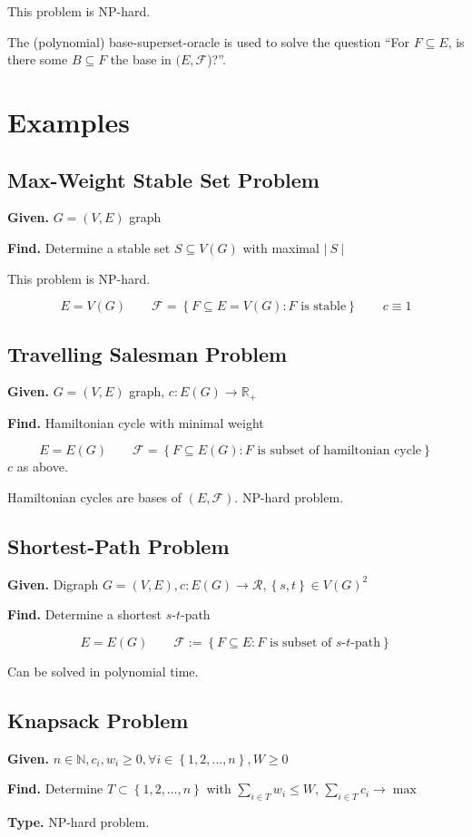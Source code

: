 \documentclass{article}
\newcommand{\card}[1]{\left|\:\!#1\:\!\right|}
\newcommand{\set}[1]{\left\{#1\right\}}
\newcommand{\given}[1]{\textbf{Given.} #1\par}
\newcommand{\find}[1]{\textbf{Find.} #1\par}
\newcommand{\gath}[2]{$#1$-$#2$-path} %
\begin{document}
This problem is NP-hard.

The (polynomial) base-superset-oracle is used to solve the question ``For $F \subseteq E$, is there some $B \subseteq F$ the base in $(E, \mathcal{F}$)?''.

\section{Examples}
\subsection{Max-Weight Stable Set Problem}
%
\given{$G = (V, E)$ graph}
\find{Determine a stable set $S \subseteq V(G)$ with maximal $\card{S}$}

This problem is NP-hard.

\[ E = V(G)  \qquad  \mathcal{F} = \set{F \subseteq E = V(G): F \text{ is stable}} \qquad c \equiv 1 \]

\subsection{Travelling Salesman Problem}
%
\given{$G = (V, E)$ graph, $c: E(G) \rightarrow \mathbb{R}_+$}
\find{Hamiltonian cycle with minimal weight}

\[ E = E(G)  \qquad  \mathcal{F} = \set{F \subseteq E(G): F \text{ is subset of hamiltonian cycle}} \]
$c$ as above.

Hamiltonian cycles are bases of $(E, \mathcal{F})$. NP-hard problem.

\subsection{Shortest-Path Problem}
%
\given{Digraph $G = (V, E), c: E(G) \rightarrow \mathcal{R}, \set{s, t} \in V(G)^2$}
\find{Determine a shortest \gath st}

\[
  E = E(G) \qquad
  \mathcal{F} := \set{F \subseteq E: F \text{ is subset of \gath st}}
\]

Can be solved in polynomial time.

\subsection{Knapsack Problem}
%
\given{$n \in \mathbb{N}, c_i, w_i \geq 0, \forall i \in \set{1, 2, \ldots, n}, W \geq 0$}
\find{Determine $T \subset \set{1, 2, \ldots, n}$ with $\sum_{i \in T} w_i \leq W$, $\sum_{i \in T} c_i \rightarrow \max$}
\textbf{Type.} NP-hard problem.\par
\end{document}
